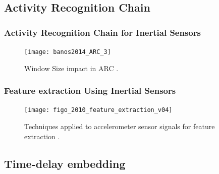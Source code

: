 \documentclass{beamer}
\begin{document}
 
 \subsection{Activity Recognition Chain}
 

\begin{frame}
\frametitle{Activity Recognition Chain for Inertial Sensors}
\vspace{-0.7cm}


\begin{figure}[!htb]
\centering    
\texttt{[image: banos2014\_ARC\_3]}
\caption[PA]{Window Size impact in ARC
 \textcolor{red}{\textbf{ \cite{Banos2014} }}.
}  
\label{fig:sn}
\end{figure}



\end{frame}



\begin{frame}
  \frametitle{Feature extraction Using Inertial Sensors}

\begin{figure}[!htb]
\centering    
\texttt{[image: figo\_2010\_feature\_extraction\_v04]}
\caption[PA]{Techniques applied to accelerometer sensor signals for feature extraction 
\textcolor{red}{\textbf{ \cite{Figo2010,Liao2015,Gupta2014,Fish2012,Zhang2011} }}.
}  
\label{fig:sn}
\end{figure}

\end{frame}





\subsection{Time-delay embedding}
\end{document}

